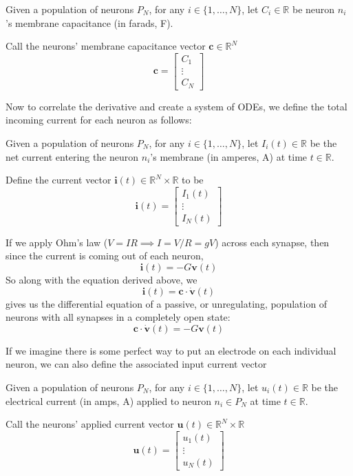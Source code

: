 \documentclass{article}
\begin{document}
\begin{definition}[$\mathbf{c} = \textbf{membrane capacitance vector}$]\label{c}
Given a population of neurons $P_{N}$, for any $i \in \{ 1, \dots, N \}$, let $C_{i}\in\mathbb{R}$ be neuron $n_{i}$'s membrane capacitance (in farads, F).

Call the neurons' membrane capacitance vector $\mathbf{c}\in\mathbb{R}^{N}$
\[ \mathbf{c} =
\begin{bmatrix}
C_{1} \\
\vdots \\
C_{N}
\end{bmatrix} \]
\end{definition}

Now to correlate the derivative and create a system of ODEs, we define the total incoming current for each neuron as follows:

\begin{definition}[$\mathbf{i}(t) = \textbf{incoming current vector}$]\label{i}
Given a population of neurons $P_{N}$, for any $i \in \{ 1, \dots, N \}$, let $I_{i}(t)\in\mathbb{R}$ be the net current entering the neuron $n_{i}$'s membrane (in amperes, A) at time $t\in\mathbb{R}$.

Define the current vector $\mathbf{i}(t)\in\mathbb{R}^{N}\times\mathbb{R}$ to be 
\[ \mathbf{i}(t) =
\begin{bmatrix}
I_{1}(t) \\
\vdots \\
I_{N}(t)
\end{bmatrix} \]
\end{definition}

If we apply Ohm's law ($V=IR\implies I=V/R=gV$) across each synapse, then since the current is coming out of each neuron,
\[ \mathbf{i}(t) = -G\mathbf{v}(t) \]
So along with the equation derived above, we
\[ \mathbf{i}(t) = \mathbf{c}\cdot\dot{\mathbf{v}}(t) \]
gives us the differential equation of a passive, or unregulating, population of neurons with all synapses in a completely open state:
\[ \boxed{ \mathbf{c}\cdot\dot{\mathbf{v}}(t) = -G\mathbf{v}(t) } \]

If we imagine there is some perfect way to put an electrode on each individual neuron, we can also define the associated input current vector
\begin{definition}[$\mathbf{u}(t) = \textbf{applied current vector}$]\label{u}
Given a population of neurons $P_{N}$, for any $i \in \{ 1, \dots, N \}$, let $u_{i}(t)\in\mathbb{R}$ be the electrical current (in amps, A) applied to neuron $n_{i}\in P_{N}$ at time $t\in\mathbb{R}$.

Call the neurons' applied current vector $\mathbf{u}(t)\in\mathbb{R}^{N}\times\mathbb{R}$
\[ \mathbf{u}(t) =
\begin{bmatrix}
u_{1}(t) \\
\vdots \\
u_{N}(t)
\end{bmatrix} \]
\end{definition}
\end{document}
